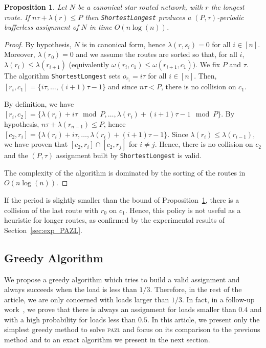 \documentclass[a4paper,10pt]{journal}
\newcommand\shortestlongest{\texttt{ShortestLongest}\xspace}
\newtheorem{proposition}{Proposition}
\newcommand\pazl{\textsc{pazl}\xspace}
\begin{document}
\begin{proposition} Let $N$ be a canonical star routed network, with $r$ the longest route. If $n\tau + \lambda(r) \leq P$ then \shortestlongest produces a $(P,\tau)$-periodic bufferless assignment of $N$ in time $O(n\log(n))$.\label{prop:SL}
\end{proposition}
\begin{proof}
By hypothesis, $N$ is in canonical form, hence $\lambda(r,s_i) = 0$ for all $i \in [n]$. Moreover, $\lambda(r_0) = 0$ and we assume the routes are sorted so that, for all $i$, $\lambda(r_i) \leq \lambda(r_{i+1})$ (equivalently $\omega(r_i,c_1) \leq \omega(r_{i+1},c_1))$. We fix $P$ and $\tau$. The algorithm \shortestlongest sets $o_{r_i} = i\tau$ for all $i \in [n]$. Then, $[r_{i},c_1] = \{i\tau,\dots, (i+1)\tau -1\}$ and since $n\tau < P$, there is no collision on $c_1$.

By definition, we have $[r_{i},c_2] = \{\lambda(r_{i}) + i\tau \mod P, \dots, \lambda(r_{i}) + (i+1)\tau -1 \mod P\}$. By hypothesis, $n\tau + \lambda(r_{n-1}) \leq P$, hence $[c_2,r_{i}] = \{\lambda(r_{i}) + i\tau, \dots, \lambda(r_{i}) + (i+1)\tau -1\}$. Since $\lambda(r_i) \leq \lambda(r_{i-1})$, we have proven that $[c_2,r_{i}] \cap [c_2,r_{j}]$ for $i \neq j$. Hence, there is no collision on $c_2$ and the $(P,\tau)$ assignment built by \shortestlongest is valid.

The complexity of the algorithm is dominated by the sorting of the routes in $O(n\log(n))$.
\end{proof}

If the period is slightly smaller than the bound of Proposition~\ref{prop:SL}, there is a collision of the last route with $r_0$ on $c_1$. Hence, this policy is not useful as a heuristic for longer routes, as confirmed by the experimental results of Section~\ref{sec:exp_PAZL}.


\subsection{Greedy Algorithm}


We propose a greedy algorithm which tries to build a valid assignment and always succeeds when the load is less than $1/3$. Therefore, in the rest of the article, we are only concerned with loads larger than $1/3$. In fact, in a follow-up work~\cite{guiraud2020scheduling}, we prove that there is always an assignment for loads smaller than $0.4$ and with a high probability for loads less than $0.5$. In this article, we present only the simplest greedy method to solve \pazl and focus on its comparison to the previous method and to an exact algorithm we present in the next section.
\end{document}
